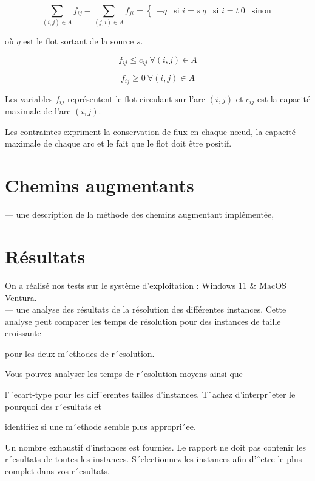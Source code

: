 \documentclass{article}
\begin{document}
$$\sum_{(i,j) \in A} f_{ij} - \sum_{(j,i) \in A} f_{ji} =
\begin{cases}
-q & \text{si } i=s \
q & \text{si } i=t \
0 & \text{sinon}
\end{cases}$$

où $q$ est le flot sortant de la source $s$.

$$f_{ij} \leq c_{ij} ~ \forall (i,j) \in A$$

$$f_{ij} \geq 0 ~ \forall (i,j) \in A $$

Les variables $f_{ij}$ représentent le flot circulant sur l'arc $(i,j)$ et $c_{ij}$ est la capacité maximale de l'arc $(i,j)$.
    
Les contraintes expriment la conservation de flux en chaque nœud, la capacité maximale de chaque arc et le fait que le flot doit être positif.


\section{Chemins augmentants}

— une description de la méthode des chemins augmentant implémentée,


\section{Résultats}
    
 On a réalisé nos tests sur le système d’exploitation : Windows 11 \& MacOS Ventura.\\

— une analyse des résultats de la résolution des différentes instances.
   Cette analyse peut comparer les
temps de résolution
   pour des instances de taille croissante

   pour les deux m´ethodes de r´esolution.

Vous pouvez analyser
   les temps de r´esolution moyens ainsi que

   l’´ecart-type pour les diff´erentes tailles
d’instances.
   Tˆachez d’interpr´eter le pourquoi des r´esultats et

   identifiez si une m´ethode semble plus
appropri´ee.

Un nombre exhaustif d’instances est fournies. Le rapport ne doit pas contenir les r´esultats de toutes
les instances. S´electionnez les instances afin d’ˆetre le plus complet dans vos r´esultats.


\end{document}

